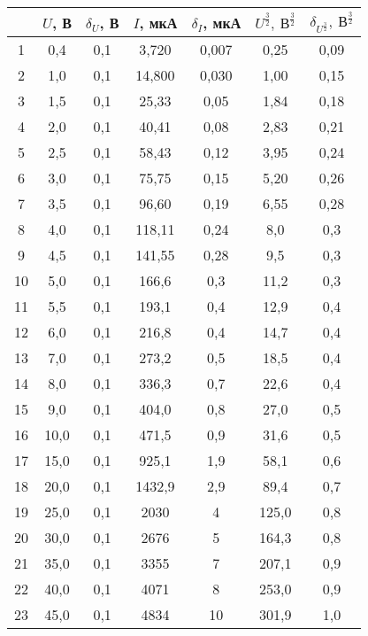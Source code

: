 \begin{table}
\centering
\label{tbl:7}
\begin{tabular}{|c|c|c|c|c|c|c|}
\hline
 & $U$, В & $\delta_U$, В & $I$, мкА & $\delta_I$, мкА & $U^{\frac{3}{2}},\ В^{\frac{3}{2}}$ & $\delta_{U^{\frac{3}{2}}},\ В^{\frac{3}{2}}$ \\
\hline
1 & 0,4 & 0,1 & 3,720 & 0,007 & 0,25 & 0,09 \\
\cline{1-7}
2 & 1,0 & 0,1 & 14,800 & 0,030 & 1,00 & 0,15 \\
\cline{1-7}
3 & 1,5 & 0,1 & 25,33 & 0,05 & 1,84 & 0,18 \\
\cline{1-7}
4 & 2,0 & 0,1 & 40,41 & 0,08 & 2,83 & 0,21 \\
\cline{1-7}
5 & 2,5 & 0,1 & 58,43 & 0,12 & 3,95 & 0,24 \\
\cline{1-7}
6 & 3,0 & 0,1 & 75,75 & 0,15 & 5,20 & 0,26 \\
\cline{1-7}
7 & 3,5 & 0,1 & 96,60 & 0,19 & 6,55 & 0,28 \\
\cline{1-7}
8 & 4,0 & 0,1 & 118,11 & 0,24 & 8,0 & 0,3 \\
\cline{1-7}
9 & 4,5 & 0,1 & 141,55 & 0,28 & 9,5 & 0,3 \\
\cline{1-7}
10 & 5,0 & 0,1 & 166,6 & 0,3 & 11,2 & 0,3 \\
\cline{1-7}
11 & 5,5 & 0,1 & 193,1 & 0,4 & 12,9 & 0,4 \\
\cline{1-7}
12 & 6,0 & 0,1 & 216,8 & 0,4 & 14,7 & 0,4 \\
\cline{1-7}
13 & 7,0 & 0,1 & 273,2 & 0,5 & 18,5 & 0,4 \\
\cline{1-7}
14 & 8,0 & 0,1 & 336,3 & 0,7 & 22,6 & 0,4 \\
\cline{1-7}
15 & 9,0 & 0,1 & 404,0 & 0,8 & 27,0 & 0,5 \\
\cline{1-7}
16 & 10,0 & 0,1 & 471,5 & 0,9 & 31,6 & 0,5 \\
\cline{1-7}
17 & 15,0 & 0,1 & 925,1 & 1,9 & 58,1 & 0,6 \\
\cline{1-7}
18 & 20,0 & 0,1 & 1432,9 & 2,9 & 89,4 & 0,7 \\
\cline{1-7}
19 & 25,0 & 0,1 & 2030 & 4 & 125,0 & 0,8 \\
\cline{1-7}
20 & 30,0 & 0,1 & 2676 & 5 & 164,3 & 0,8 \\
\cline{1-7}
21 & 35,0 & 0,1 & 3355 & 7 & 207,1 & 0,9 \\
\cline{1-7}
22 & 40,0 & 0,1 & 4071 & 8 & 253,0 & 0,9 \\
\cline{1-7}
23 & 45,0 & 0,1 & 4834 & 10 & 301,9 & 1,0 \\
\cline{1-7}
\hline
\end{tabular}
\end{table}

